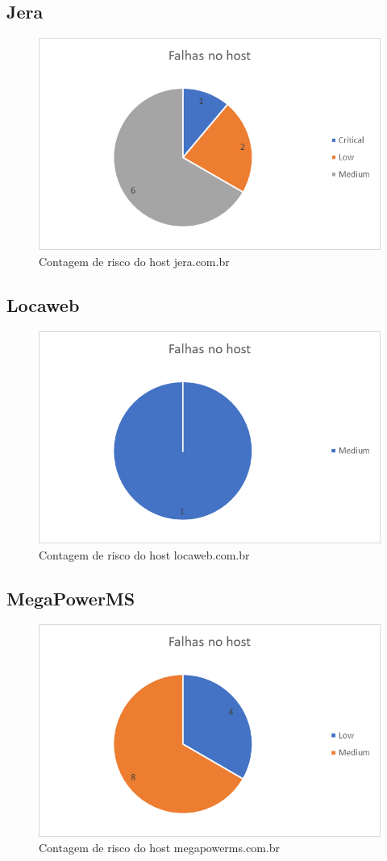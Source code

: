 \documentclass[
	12pt,				%
	openright,			%
	twoside,			%
	a4paper,			%
	english,			%
	french,				%
	spanish,			%
	brazil				%
	]{abntex2}
\begin{document}
\subsection{Jera}
\begin{figure}[h]
	\centering
	\includegraphics[width=0.7\linewidth]{Imagens/Jera}
	\caption[Jera]{Contagem de risco do host jera.com.br}
	\label{fig:jera}
\end{figure}

\subsection{Locaweb}
\begin{figure}[h]
	\centering
	\includegraphics[width=0.7\linewidth]{Imagens/Locaweb}
	\caption[Locaweb]{Contagem de risco do host locaweb.com.br}
	\label{fig:locaweb}
\end{figure}

\subsection{MegaPowerMS}
\begin{figure}[h]
	\centering
	\includegraphics[width=0.7\linewidth]{Imagens/MegaPowerMS}
	\caption[MegaPowerMS]{Contagem de risco do host megapowerms.com.br}
	\label{fig:megapowerms}
\end{figure}
\end{document}
